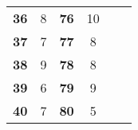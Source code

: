 \begin{table}[]
\begin{tabular}{cccccc}
		\textbf{36}                     & 8                  & \textbf{76}                     & 10                 &                               &                               \\
		\textbf{37}                     & 7                  & \textbf{77}                     & 8                  &                               &                               \\
		\textbf{38}                     & 9                  & \textbf{78}                     & 8                  &                               &                               \\
		\textbf{39}                     & 6                  & \textbf{79}                     & 9                  &                               &                               \\
		\textbf{40}                     & 7                  & \textbf{80}                     & 5                  &                               &                              
	\end{tabular}
\end{table}
